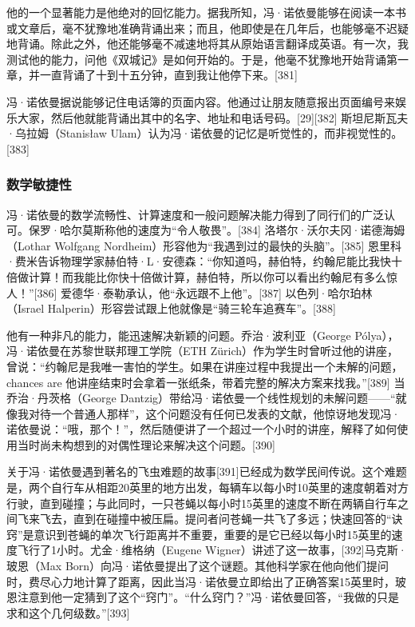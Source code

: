 他的一个显著能力是他绝对的回忆能力。据我所知，冯·诺依曼能够在阅读一本书或文章后，毫不犹豫地准确背诵出来；而且，他即使是在几年后，也能够毫不迟疑地背诵。除此之外，他还能够毫不减速地将其从原始语言翻译成英语。有一次，我测试他的能力，问他《双城记》是如何开始的。于是，他毫不犹豫地开始背诵第一章，并一直背诵了十到十五分钟，直到我让他停下来。[381]

冯·诺依曼据说能够记住电话簿的页面内容。他通过让朋友随意报出页面编号来娱乐大家，然后他就能背诵出其中的名字、地址和电话号码。[29][382] 斯坦尼斯瓦夫·乌拉姆（Stanisław Ulam）认为冯·诺依曼的记忆是听觉性的，而非视觉性的。[383]
\subsubsection{数学敏捷性}  
冯·诺依曼的数学流畅性、计算速度和一般问题解决能力得到了同行们的广泛认可。保罗·哈尔莫斯称他的速度为“令人敬畏”。[384] 洛塔尔·沃尔夫冈·诺德海姆（Lothar Wolfgang Nordheim）形容他为“我遇到过的最快的头脑”。[385] 恩里科·费米告诉物理学家赫伯特·L·安德森：“你知道吗，赫伯特，约翰尼能比我快十倍做计算！而我能比你快十倍做计算，赫伯特，所以你可以看出约翰尼有多么惊人！”[386] 爱德华·泰勒承认，他“永远跟不上他”。[387] 以色列·哈尔珀林（Israel Halperin）形容尝试跟上他就像是“骑三轮车追赛车”。[388]

他有一种非凡的能力，能迅速解决新颖的问题。乔治·波利亚（George Pólya），冯·诺依曼在苏黎世联邦理工学院（ETH Zürich）作为学生时曾听过他的讲座，曾说：“约翰尼是我唯一害怕的学生。如果在讲座过程中我提出一个未解的问题， chances are 他讲座结束时会拿着一张纸条，带着完整的解决方案来找我。”[389] 当乔治·丹茨格（George Dantzig）带给冯·诺依曼一个线性规划的未解问题——“就像我对待一个普通人那样”，这个问题没有任何已发表的文献，他惊讶地发现冯·诺依曼说：“哦，那个！”，然后随便讲了一个超过一个小时的讲座，解释了如何使用当时尚未构想到的对偶性理论来解决这个问题。[390]

关于冯·诺依曼遇到著名的飞虫难题的故事[391]已经成为数学民间传说。这个难题是，两个自行车从相距20英里的地方出发，每辆车以每小时10英里的速度朝着对方行驶，直到碰撞；与此同时，一只苍蝇以每小时15英里的速度不断在两辆自行车之间飞来飞去，直到在碰撞中被压扁。提问者问苍蝇一共飞了多远；快速回答的“诀窍”是意识到苍蝇的单次飞行距离并不重要，重要的是它已经以每小时15英里的速度飞行了1小时。尤金·维格纳（Eugene Wigner）讲述了这一故事，[392]马克斯·玻恩（Max Born）向冯·诺依曼提出了这个谜题。其他科学家在他向他们提问时，费尽心力地计算了距离，因此当冯·诺依曼立即给出了正确答案15英里时，玻恩注意到他一定猜到了这个“窍门”。“什么窍门？”冯·诺依曼回答，“我做的只是求和这个几何级数。”[393]
